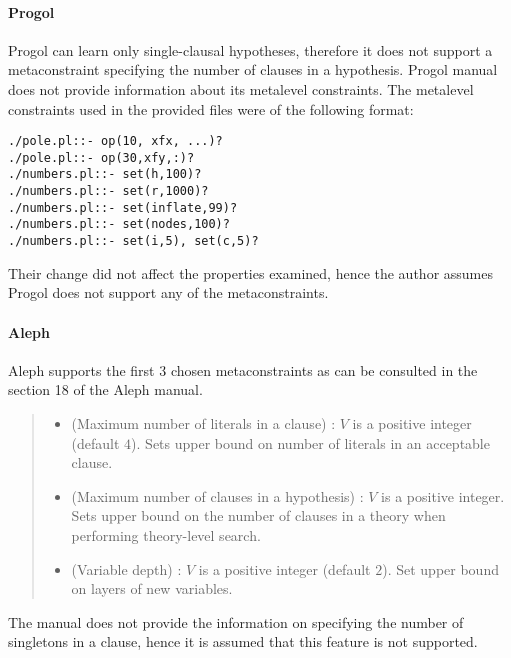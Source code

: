 \paragraph{Progol}
Progol can learn only single-clausal hypotheses\cite{muggleton2012mc}, therefore it does not support a metaconstraint specifying the number of clauses in a hypothesis.
Progol manual does not provide information about its metalevel constraints. The metalevel constraints used in the provided files\cite{muggleton1999progolWebsite} were of the following format:
\begin{lstlisting}
./pole.pl::- op(10, xfx, ...)?
./pole.pl::- op(30,xfy,:)?
./numbers.pl::- set(h,100)?
./numbers.pl::- set(r,1000)?
./numbers.pl::- set(inflate,99)?
./numbers.pl::- set(nodes,100)?
./numbers.pl::- set(i,5), set(c,5)?
\end{lstlisting}
Their change did not affect the properties examined, hence the author assumes Progol does not support any of the metaconstraints.

\paragraph{Aleph}
Aleph supports the first 3 chosen metaconstraints as can be consulted in the section 18 of the Aleph manual\cite{aleph2007}.
\begin{quote}
\begin{itemize}
\item (Maximum number of literals in a clause) :
$V$ is a positive integer (default $4$). Sets upper bound on number of literals in an acceptable clause.
\item (Maximum number of clauses in a hypothesis) :
$V$ is a positive integer. Sets upper bound on the number of clauses in a theory  when performing theory-level search.
\item (Variable depth) : $V$ is a positive integer (default $2$). Set upper bound on layers of new variables.
\end{itemize}
\end{quote}

The manual does not provide the information on specifying the number of singletons in a clause, hence it is assumed that this feature is not supported.

